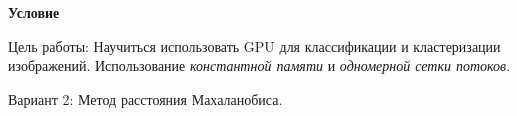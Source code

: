 \textbf{\large Условие}

Цель работы: Научиться использовать GPU для классификации и кластеризации изображений. Использование \textit{константной памяти} и \textit{одномерной сетки потоков}.

Вариант 2: Метод расстояния Махаланобиса.

